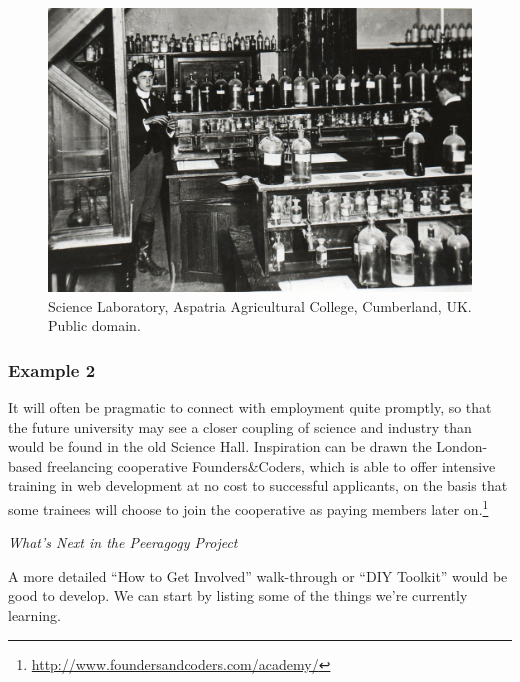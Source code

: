 \begin{figure}
\vspace{-1cm}
\begin{center}
\includegraphics[width=.45\textwidth]{The_Science_Laboratory}
\end{center}
\vspace{-.5cm}
\caption{Science Laboratory, Aspatria Agricultural College, Cumberland, UK. Public
  domain.\label{science-laboratory}}
\vspace{-.6cm}
\end{figure}

\subsubsection*{Example 2} It will often be pragmatic to connect
 with employment quite promptly, so that
the future university may see a closer coupling of science and
industry than would be found in the old Science Hall.  Inspiration can
be drawn the London-based freelancing cooperative Founders\&Coders,
which is able to offer intensive training in web development at no
cost to successful applicants, on the basis that some trainees will
choose to join the cooperative as paying members later
on.\footnote{\url{http://www.foundersandcoders.com/academy/}}


\begin{framed}
\noindent 
\emph{What's Next in the Peeragogy Project}
\begin{collectinmacro}{\NewcomerWN}{}{}
A more detailed ``How to Get Involved'' walk-through or ``DIY Toolkit'' would be good to develop. We can start by listing some of the things we're currently learning.
\end{collectinmacro}
\NewcomerWN
\end{framed}

\newpage
